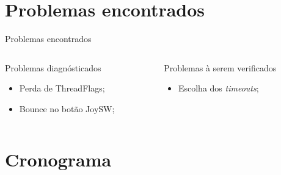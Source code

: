 \documentclass{if-beamer}
\begin{document}
\section{Problemas encontrados}

\begin{frame}{Problemas encontrados}
	
	\begin{columns}
		
		\begin{column}{0.5\textwidth}
			
			\begin{block}{Problemas diagnósticados}
				
				\begin{itemize}
					\item Perda de ThreadFlags;
					\item Bounce no botão JoySW;
					
				\end{itemize}
				
			\end{block}
			
		\end{column}
		
		\begin{column}{0.5\textwidth}
			
			\begin{block}{Problemas à serem verificados}
				
				\begin{itemize}
					\item Escolha dos \textit{timeouts};
					
				\end{itemize}
				
			\end{block}
			
		\end{column}
		
	\end{columns}
	
\end{frame}


\section{Cronograma}
\end{document}
